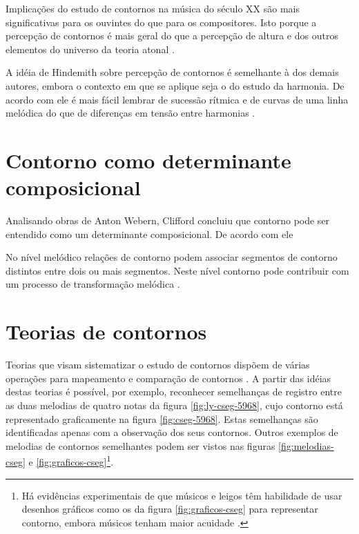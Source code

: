 Implicações do estudo de contornos na música do século XX são mais
significativas para os ouvintes do que para os compositores. Isto
porque a percepção de contornos é mais geral do que a percepção de
altura e dos outros elementos do universo da teoria atonal
\cite[p. 224]{friedmann85:methodology}.

A idéia de Hindemith sobre percepção de contornos é semelhante à dos
demais autores, embora o contexto em que se aplique seja o do estudo
da harmonia. De acordo com ele é mais fácil lembrar de sucessão
rítmica e de curvas de uma linha melódica do que de diferenças em
tensão entre harmonias \cite[p. 175]{hindemith41:craft}.

\section{Contorno como determinante composicional}
\label{sec:cont-como-determ}

Analisando obras de Anton Webern, Clifford concluiu que contorno pode
ser entendido como um determinante composicional. De acordo com ele

No nível melódico relações de contorno podem associar segmentos de
contorno distintos entre dois ou mais segmentos. Neste nível contorno
pode contribuir com um processo de transformação melódica
\cite[p. 159]{clifford95:contour}.

\section{Teorias de contornos}
\label{sec:teor-de-cont}

Teorias que visam sistematizar o estudo de contornos dispõem de várias
operações para mapeamento e comparação de contornos
\cite{friedmann85:methodology,friedmann87:response,morris87:composition,morris93:directions,marvin.ea87:relating,clifford95:contour,polansky.ea92:possible,quinn97:fuzzy,beard03:contour}.
A partir das idéias destas teorias é possível, por exemplo, reconhecer
semelhanças de registro entre as duas melodias de quatro notas da
figura \ref{fig:ly-cseg-5968}, cujo contorno está representado
graficamente na figura \ref{fig:cseg-5968}. Estas semelhanças são
identificadas apenas com a observação dos seus contornos. Outros
exemplos de melodias de contornos semelhantes podem ser vistos nas
figuras \ref{fig:melodias-cseg} e \ref{fig:graficos-cseg}\footnote{Há
  evidências experimentais de que músicos e leigos têm habilidade de
  usar desenhos gráficos como os da figura \ref{fig:graficos-cseg}
  para representar contorno, embora músicos tenham maior acuidade
  \cite[p. 69]{marvin88:generalized}.}.

